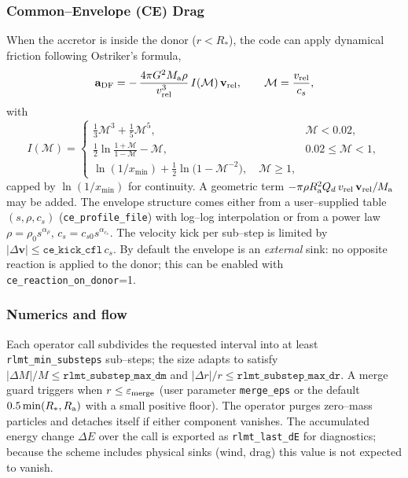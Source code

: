 \documentclass[11pt]{article}
\begin{document}
\subsubsection{Common–Envelope (CE) Drag}
When the accretor is inside the donor ($r<R_\ast$), the code can apply
dynamical friction following Ostriker’s formula,
\[
\mathbf a_{\rm DF} = -\,\frac{4\pi G^2 M_{\rm a}\rho}{v_{\rm rel}^3}\,
I(\mathcal M)\,\mathbf v_{\rm rel},\qquad\mathcal M=\frac{v_{\rm rel}}{c_s},
\]
with
\[
I(\mathcal M)=
\begin{cases}
\frac{1}{3}\mathcal M^3+\frac{1}{5}\mathcal M^5, & \mathcal M<0.02,\\[0.4em]
\frac{1}{2}\ln\!\frac{1+\mathcal M}{1-\mathcal M}-\mathcal M, & 0.02\le\mathcal M<1,\\[0.4em]
\ln(1/x_{\min})+\tfrac12\ln\!\bigl(1-\mathcal M^{-2}\bigr), \quad \mathcal M\ge1,
\end{cases}
\]
capped by $\ln(1/x_{\min})$ for continuity. A geometric term
$-\pi\rho R_{\rm a}^2 Q_d\,v_{\rm rel}\,\mathbf v_{\rm rel}/M_{\rm a}$ may be
added. The envelope structure comes either from a user–supplied table
$(s,\rho,c_s)$ (\texttt{ce\_profile\_file}) with log–log interpolation or from
a power law $\rho=\rho_0 s^{\alpha_\rho}$, $c_s=c_{s0}s^{\alpha_{c_s}}$.
The velocity kick per sub–step is limited by
$|\Delta\mathbf v|\le\texttt{ce\_kick\_cfl}\,c_s$.
By default the envelope is an \emph{external} sink: no opposite reaction is
applied to the donor; this can be enabled with \texttt{ce\_reaction\_on\_donor}=1.

\subsubsection{Numerics and flow}
Each operator call subdivides the requested interval into at least
\texttt{rlmt\_min\_substeps} sub–steps; the size adapts to satisfy
$|\Delta M|/M\le\texttt{rlmt\_substep\_max\_dm}$ and
$|\Delta r|/r\le\texttt{rlmt\_substep\_max\_dr}$. A merge guard triggers when
$r\le\varepsilon_{\rm merge}$ (user parameter \texttt{merge\_eps} or the
default $0.5\min(R_\ast,R_{\rm a})$ with a small positive floor). The operator
purges zero–mass particles and detaches itself if either component vanishes.
The accumulated energy change $\Delta E$ over the call is exported as
\texttt{rlmt\_last\_dE} for diagnostics; because the scheme includes physical
sinks (wind, drag) this value is not expected to vanish.
\end{document}
